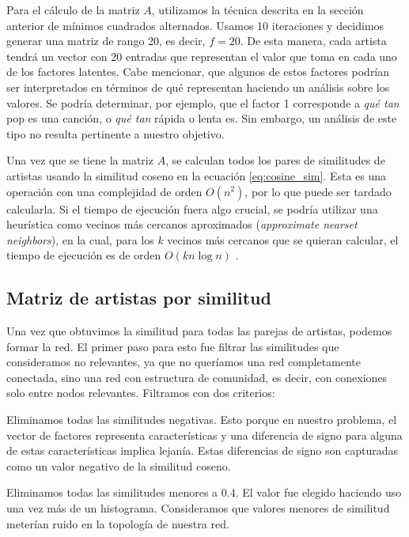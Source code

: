 \documentclass[conference]{IEEEtran}
\begin{document}
Para el cálculo de la matriz $A$, utilizamos la técnica descrita en la sección anterior de mínimos cuadrados alternados. Usamos 10 iteraciones y decidimos generar una matriz de rango 20, es decir, $f = 20$. De esta manera, cada artista tendrá un vector con 20 entradas que representan el valor que toma en cada uno de los factores latentes. Cabe mencionar, que algunos de estos factores podrían ser interpretados en términos de qué representan haciendo un análisis sobre los valores. Se podría determinar, por ejemplo, que el factor 1 corresponde a \textit{qué tan} pop es una canción, o \textit{qué tan} rápida o lenta es. Sin embargo, un análisis de este tipo no resulta pertinente a nuestro objetivo.

Una vez que se tiene la matriz $A$, se calculan todos los pares de similitudes de artistas usando la similitud coseno en la ecuación \ref{eq:cosine_sim}. Esta es una operación con una complejidad de orden $O(n^2)$, por lo que puede ser tardado calcularla. Si el tiempo de ejecución fuera algo crucial, se podría utilizar una heurística como vecinos más cercanos aproximados (\textit{approximate nearset neighbors}), en la cual, para los $k$ vecinos más cercanos que se quieran calcular, el tiempo de ejecución es de orden $O(kn \log{n})$ \cite{arya1994optimal}.

\subsection{Matriz de artistas por similitud}

Una vez que obtuvimos la similitud para todas las parejas de artistas, podemos formar la red. El primer paso para esto fue filtrar las similitudes que consideramos no relevantes, ya que no queríamos una red completamente conectada, sino una red con estructura de comunidad, es decir, con conexiones solo entre nodos relevantes. Filtramos con dos criterios:

\begin{compactenum}
    \item Eliminamos todas las similitudes negativas. Esto porque en nuestro problema, el vector de factores representa características y una diferencia de signo para alguna de estas características implica lejanía. Estas diferencias de signo son capturadas como un valor negativo de la similitud coseno.
    \item Eliminamos todas las similitudes menores a $0.4$. El valor fue elegido haciendo uso una vez más de un histograma. Consideramos que valores menores de similitud meterían ruido en la topología de nuestra red.
\end{compactenum}
\end{document}
